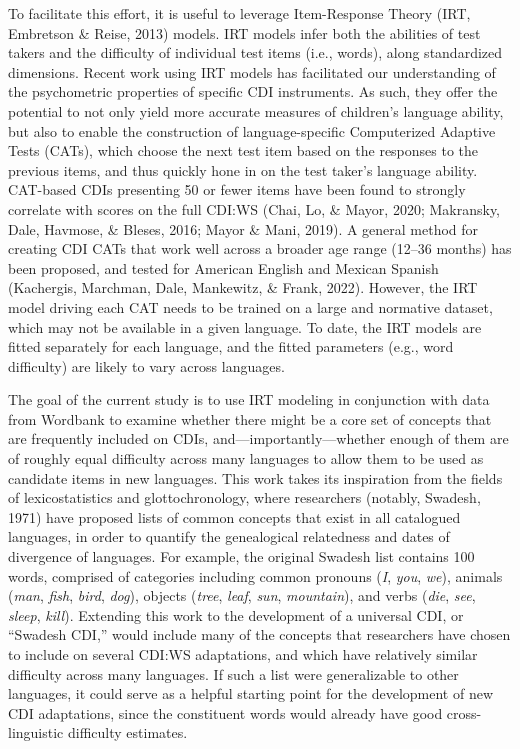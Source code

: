 \documentclass[10pt, letterpaper]{article}
\begin{document}
To facilitate this effort, it is useful to leverage Item-Response Theory
(IRT, Embretson \& Reise, 2013) models. IRT models infer both the
abilities of test takers and the difficulty of individual test items
(i.e., words), along standardized dimensions. Recent work using IRT
models has facilitated our understanding of the psychometric properties
of specific CDI instruments. As such, they offer the potential to not
only yield more accurate measures of children's language ability, but
also to enable the construction of language-specific Computerized
Adaptive Tests (CATs), which choose the next test item based on the
responses to the previous items, and thus quickly hone in on the test
taker's language ability. CAT-based CDIs presenting 50 or fewer items
have been found to strongly correlate with scores on the full CDI:WS
(Chai, Lo, \& Mayor, 2020; Makransky, Dale, Havmose, \& Bleses, 2016;
Mayor \& Mani, 2019). A general method for creating CDI CATs that work
well across a broader age range (12--36 months) has been proposed, and
tested for American English and Mexican Spanish (Kachergis, Marchman,
Dale, Mankewitz, \& Frank, 2022). However, the IRT model driving each
CAT needs to be trained on a large and normative dataset, which may not
be available in a given language. To date, the IRT models are fitted
separately for each language, and the fitted parameters (e.g., word
difficulty) are likely to vary across languages.

The goal of the current study is to use IRT modeling in conjunction with
data from Wordbank to examine whether there might be a core set of
concepts that are frequently included on CDIs,
and---importantly---whether enough of them are of roughly equal
difficulty across many languages to allow them to be used as candidate
items in new languages. This work takes its inspiration from the fields
of lexicostatistics and glottochronology, where researchers (notably,
Swadesh, 1971) have proposed lists of common concepts that exist in all
catalogued languages, in order to quantify the genealogical relatedness
and dates of divergence of languages. For example, the original Swadesh
list contains 100 words, comprised of categories including common
pronouns (\emph{I}, \emph{you}, \emph{we}), animals (\emph{man},
\emph{fish}, \emph{bird}, \emph{dog}), objects (\emph{tree},
\emph{leaf}, \emph{sun}, \emph{mountain}), and verbs (\emph{die},
\emph{see}, \emph{sleep}, \emph{kill}). Extending this work to the
development of a universal CDI, or ``Swadesh CDI,'' would include many
of the concepts that researchers have chosen to include on several
CDI:WS adaptations, and which have relatively similar difficulty across
many languages. If such a list were generalizable to other languages, it
could serve as a helpful starting point for the development of new CDI
adaptations, since the constituent words would already have good
cross-linguistic difficulty estimates.
\end{document}
